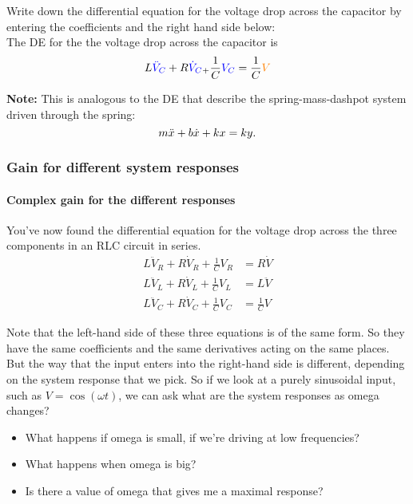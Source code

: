 Write down the differential equation for the voltage drop across the capacitor
by entering the coefficients and the right hand side below: \\

The DE for the the voltage drop across the capacitor is
\begin{equation*}
  \displaystyle  \displaystyle L{\color{blue}{\ddot{V}_ C}}
  +R{\color{blue}{\dot{V}_ C}} _+\frac{1}{C} {\color{blue}{V_ C}}
  \displaystyle =
  \displaystyle \frac{1}{C} {\color{orange}{V}}
\end{equation*}

\textbf{Note:} This is analogous to the DE that describe the spring-mass-dashpot
system driven through the spring:
\begin{equation*}
  \displaystyle  \displaystyle m\ddot{x}+b\dot{x}+kx
  \displaystyle =
  \displaystyle  ky.
\end{equation*}

\clearpage
\subsubsection{Gain for different system responses}

\paragraph{Complex gain for the different responses}
You've now found the differential equation
for the voltage drop across the three components in an RLC
circuit in series.
\begin{align*}
  L \ddot V _R + R \dot V _R + \frac{1}{C} V _R &= R \dot V \\
  L \ddot V _L + R \dot V _L + \frac{1}{C} V _L &= L \ddot V \\
  L \ddot V _C + R \dot V _C + \frac{1}{C} V _C &= \frac{1}{C} V  
\end{align*}

Note that the left-hand side of these three equations
is of the same form.
So they have the same coefficients
and the same derivatives acting on the same places.
But the way that the input enters into the right-hand side
is different, depending on the system response that we pick.
So if we look at a purely sinusoidal input, such as
$V = \cos (\omega t)$, we can ask what
are the system responses as omega changes?

\begin{itemize}
\item What happens if omega is small, if we're driving at low frequencies?
\item What happens when omega is big?
\item Is there a value of omega that gives me a maximal response? 
\end{itemize}

